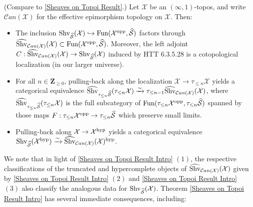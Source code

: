 \documentclass[10pt]{article}
\newcommand{\mS}{\mathcal S}
\newcommand{\C}{\mathcal C}
\newcommand{\cX}{\mathcal{X}}
\newcommand{\ZZ}{\mathbb{Z}}
\def\ZZ{{\mathbf Z}}
\theoremstyle{witharg}
\theoremstyle{witharg}
\theoremstyle{witharg2}
\begin{document}
\begin{theorem}{}\label{Sheaves on Topoi Result Intro}

     (Compare to \ref{Sheaves on Topoi Result}.) Let $\cX$ be an $(\infty,1)$-topos, and write $\C an(\cX)$ for the effective epimorphism topology on $\cX$. Then:


     \begin{itemize}

         \item [$(1)$] The inclusion $\textnormal{Shv}_{\widehat{\mS}}(\cX)\hookrightarrow \textnormal{Fun}(\cX^{\textnormal{opp}},\widehat{\mS})$ factors through $\widehat{\textnormal{Shv}}_{\C an(\cX)}(\cX)\subset \textnormal{Fun}(\cX^{\textnormal{opp}},\widehat{\mS})$. Moreover, the left adjoint $C:\widehat{\textnormal{Shv}}_{\C an(\cX)}(\cX)\rightarrow \textnormal{Shv}_{\widehat{\mS}}(\cX)$ induced by HTT 6.3.5.28 is a cotopological localization (in our larger universe).

         \item [$(2)$] For all $n\in \ZZ_{\geq 0}$, pulling-back along the localization $\cX\rightarrow \tau_{\leq n}\cX$ yields a categorical equivalence $\widehat{\textnormal{Shv}}_{\tau_{\leq n}\widehat{\mS}}(\tau_{\leq n}\cX)\xrightarrow{\sim} \tau_{\leq n-1}\widehat{\textnormal{Shv}}_{\C an(\cX)}(\cX)$, where $\widehat{\textnormal{Shv}}_{\tau_{\leq n}\widehat{\mS}}(\tau_{\leq n}\cX)$ is the full subcategory of $\textnormal{Fun}(\tau_{\leq n}\cX^{\textnormal{opp}},\tau_{\leq n}\widehat{\mS})$ spanned by those maps $F:\tau_{\leq n}\cX^{\textnormal{opp}}\rightarrow \tau_{\leq n}\widehat{\mS}$ which preserve small limits.


         \item [$(3)$] Pulling-back along $\cX\rightarrow \cX^{\textnormal{hyp}}$ yields a categorical equivalence $\textnormal{Shv}_{\widehat{\mS}}(\cX^{\textnormal{hyp}})\xrightarrow{\sim} \widehat{\textnormal{Shv}}_{\C an(\cX)}(\cX)^{\textnormal{hyp}}$.
         
     \end{itemize}
    
\end{theorem}


 \noindent We note that in light of \ref{Sheaves on Topoi Result Intro} $(1)$, the respective classifications of the truncated and hypercomplete objects of $\widehat{\textnormal{Shv}}_{\C an(\cX)}(\cX)$ given by \ref{Sheaves on Topoi Result Intro} $(2)$ and \ref{Sheaves on Topoi Result Intro} $(3)$ also classify the analogous data for $\textnormal{Shv}_{\widehat{\mS}}(\cX)$. Theorem \ref{Sheaves on Topoi Result Intro} has several immediate consequences, including:  
\end{document}
